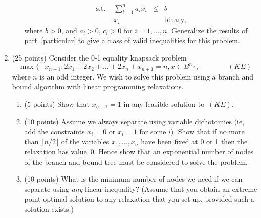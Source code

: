 \begin{enumerate}
\begin{enumerate}
\begin{displaymath}
\begin{array}{lrcl}
                \mbox{s.t. }  & \sum_{i=1}^n a_ix_i & \leq & b \\
                              &            x_i  && \mbox{binary,}
              \end{array}
            \end{displaymath}
            where $b>0$, and $a_i>0$, $c_i>0$ for $i=1,\ldots,n$.
            Generalize the results of part~\ref{particular} to give a class of
            valid inequalities for this problem.
      \end{enumerate}
  \item (25 points)
          Consider the 0-1 equality knapsack problem
          \begin{displaymath}
             \max \{-x_{n+1} : 2x_1 + 2x_2 + \ldots + 2x_n + x_{n+1} = n,
                         x \in B^n \},  \qquad\qquad (KE)
          \end{displaymath}
          where $n$ is an odd integer.
          We wish to solve this problem using a branch and bound algorithm
          with linear programming relaxations.
       \begin{enumerate}
         \item (5 points)
          Show that $x_{n+1}=1$ in any feasible solution to~$(KE)$. 
         \item (10 points)
          Assume
          we always separate using variable dichotomies
          (ie, add the constraints $x_i = 0$ or $x_i = 1$ for some $i$).
          Show that if no more than $\lfloor n/2 \rfloor$
          of the variables $x_1,\ldots,x_n$
          have been fixed at 0 or 1 then the relaxation has value~0.
          Hence show that an exponential number of nodes of the
          branch and bound tree must be considered to solve the problem.
         \item (10 points)
          What is the minimum number of nodes we need if we can separate
          using {\em any} linear inequality?
          (Assume that you obtain an extreme point optimal solution to any
          relaxation that you set up, provided such a solution exists.)
       \end{enumerate}
\end{enumerate}


